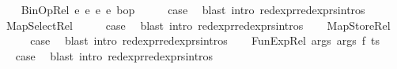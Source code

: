 \begin{isabellebody}
\isamarkupfalse%
\isanewline
\ \ \isamarkupfalse%
\ {\isacharparenleft}{\kern0pt}BinOp{\isacharunderscore}{\kern0pt}Rel\ e{}{}\ e{}{}\ e{}{}\ e{}{}\ bop{\isacharparenright}{\kern0pt}\isanewline
\ \ \isamarkupfalse%
\ \isamarkupfalse%
\ {\isacharquery}{\kern0pt}case\ \isamarkupfalse%
\ {\isacharparenleft}{\kern0pt}blast\ intro{\isacharcolon}{\kern0pt}\ red{\isacharunderscore}{\kern0pt}expr{\isacharunderscore}{\kern0pt}red{\isacharunderscore}{\kern0pt}exprs{\isachardot}{\kern0pt}intros{\isacharparenright}{\kern0pt}\isanewline
{}\isamarkupfalse%
\isanewline
\ \ \isamarkupfalse%
\ {\isacharparenleft}{\kern0pt}MapSelect{\isacharunderscore}{\kern0pt}Rel{\isacharparenright}{\kern0pt}\isanewline
\ \ \isamarkupfalse%
\ \isamarkupfalse%
\ {\isacharquery}{\kern0pt}case\ \isamarkupfalse%
\ {\isacharparenleft}{\kern0pt}blast\ intro{\isacharcolon}{\kern0pt}\ red{\isacharunderscore}{\kern0pt}expr{\isacharunderscore}{\kern0pt}red{\isacharunderscore}{\kern0pt}exprs{\isachardot}{\kern0pt}intros{\isacharparenright}{\kern0pt}\isanewline
{}\isamarkupfalse%
\isanewline
\ \ \isamarkupfalse%
\ {\isacharparenleft}{\kern0pt}MapStore{\isacharunderscore}{\kern0pt}Rel{\isacharparenright}{\kern0pt}\isanewline
\ \ \isamarkupfalse%
\ \isamarkupfalse%
\ {\isacharquery}{\kern0pt}case\ \isamarkupfalse%
\ {\isacharparenleft}{\kern0pt}blast\ intro{\isacharcolon}{\kern0pt}\ red{\isacharunderscore}{\kern0pt}expr{\isacharunderscore}{\kern0pt}red{\isacharunderscore}{\kern0pt}exprs{\isachardot}{\kern0pt}intros{\isacharparenright}{\kern0pt}\isanewline
{}\isamarkupfalse%
\isanewline
\ \ \isamarkupfalse%
\ {\isacharparenleft}{\kern0pt}FunExp{\isacharunderscore}{\kern0pt}Rel\ args{}\ args{}\ f\ ts{\isacharparenright}{\kern0pt}\isanewline
\ \ \isamarkupfalse%
\ \isamarkupfalse%
\ {\isacharquery}{\kern0pt}case\ \isamarkupfalse%
\ {\isacharparenleft}{\kern0pt}blast\ intro{\isacharcolon}{\kern0pt}\ red{\isacharunderscore}{\kern0pt}expr{\isacharunderscore}{\kern0pt}red{\isacharunderscore}{\kern0pt}exprs{\isachardot}{\kern0pt}intros{\isacharparenright}{\kern0pt}\isanewline
{}\isamarkupfalse%

\end{isabellebody}
